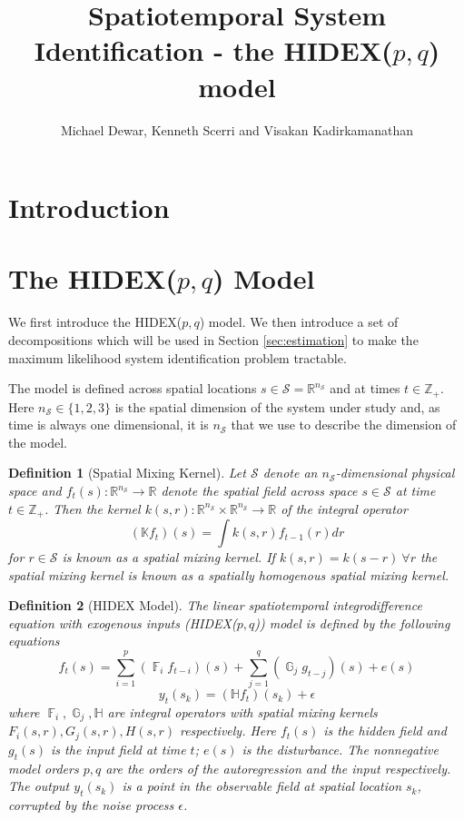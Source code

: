 \documentclass{IEEEtran}
\title{Spatiotemporal System Identification - the HIDEX($p,q$) model}
\author{Michael Dewar, Kenneth Scerri and Visakan Kadirkamanathan}
\DeclareMathOperator{\F}{\mathbb{F}}
\DeclareMathOperator{\G}{\mathbb{G}}
\DeclareMathOperator{\onto}{\rightarrow}
\newtheorem{definition}{Definition}
\begin{document}
\maketitle

\section{Introduction}

\section{The HIDEX($p,q$) Model}
\label{sec:model}

We first introduce the HIDEX($p,q$) model. We then introduce a set of decompositions which will be used in Section \ref{sec:estimation} to make the maximum likelihood system identification problem tractable. 

The model is defined across spatial locations $s \in \mathcal{S} = \mathbb{R}^{n_\mathcal{S}}$ and at times $t \in \mathbb{Z}_+$. Here $n_\mathcal{S} \in \{1,2,3\}$ is the spatial dimension of the system under study and, as time is always one dimensional, it is $n_\mathcal{S}$ that we use to describe the dimension of the model. 

\begin{definition}[Spatial Mixing Kernel]
	Let $\mathcal{S}$ denote an $n_\mathcal{S}$-dimensional physical space and $f_t(s): \mathbb{R}^{n_\mathcal{S}} \onto \mathbb{R}$ denote the spatial field across space $s \in \mathcal{S}$ at time $t \in \mathbb{Z}_+$. Then the kernel $k(s,r): \mathbb{R}^{n_\mathcal{S}} \times \mathbb{R}^{n_\mathcal{S}} \onto \mathbb{R}$ of the integral operator
	\begin{equation}
		(\mathbb{K}f_t)(s) = \int k(s,r) f_{t-1}(r) dr
	\end{equation}
	for $r \in \mathcal{S}$ is known as a \emph{spatial mixing kernel}. If $k(s,r) = k(s-r) ~ \forall r$ the spatial mixing kernel is known as a \emph{spatially homogenous spatial mixing kernel}.
\end{definition}

\begin{definition}[HIDEX Model]
	\label{def:hidex}
	The linear spatiotemporal integrodifference equation with exogenous inputs (HIDEX($p,q$)) model is defined by the following equations
	\begin{equation}
		\label{eqn:hidex-hidden}
	f_t(s)= \sum_{i=1}^{p} (\F_i f_{t-i})(s) + \sum_{j=1}^{q}(\G_j g_{t-j})(s)+e(s)
	\end{equation}
	\begin{equation}
	\label{eqn:hidex-obs}
	y_t(s_k) = (\mathbb{H}f_t)(s_k) + \epsilon
	\end{equation}
	where $\F_i,\G_j,\mathbb{H}$ are integral operators with spatial mixing kernels $F_i(s,r), G_j(s,r), H(s,r)$ respectively. Here $f_t(s)$ is the hidden field and $g_{t}(s)$ is the input field at time $t$; $e(s)$ is the disturbance. The nonnegative model orders $p,q$ are the orders of the autoregression and the input respectively. The output $y_t(s_k)$ is a point in the observable field at spatial location $s_k$, corrupted by the noise process $\epsilon$.
\end{definition}
\end{document}

